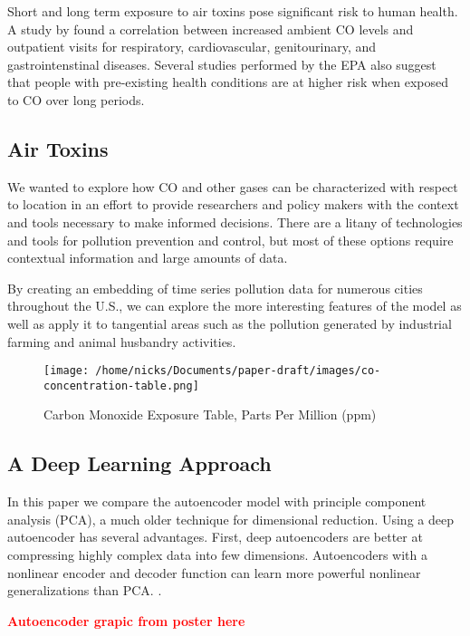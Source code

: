 \documentclass{article}
\newcommand\note[1]{\textbf{\textcolor{red}{#1}}}
\begin{document}
Short and long term exposure to air toxins pose significant risk to human health. 
A study by \textcite{Wang19} found a correlation  between increased ambient CO
levels and outpatient visits for respiratory, cardiovascular, genitourinary, and gastrointenstinal
diseases. Several studies performed by the EPA also suggest that people with pre-existing health
conditions are at higher risk when exposed to CO over long periods.\par

\subsection{Air Toxins}
We wanted to explore how CO and other gases can be characterized with respect to location
in an effort to provide researchers and policy makers with the context and tools necessary to
make informed decisions. There are a litany of technologies and tools for pollution prevention
and control, but most of these options require contextual information and large amounts of data.
\par
By creating an embedding of time series pollution data for numerous cities throughout the U.S.,
we can explore the more interesting features of the model as well as apply it to tangential 
areas such as the pollution generated by industrial farming and animal husbandry activities.

\begin{figure}[h]
\texttt{[image: /home/nicks/Documents/paper-draft/images/co-concentration-table.png]}
    \caption{Carbon Monoxide Exposure Table, Parts Per Million (ppm)}
    \label{fig:co-exposure}
\end{figure}

\subsection{A Deep Learning Approach}
In this paper we compare the autoencoder model with principle component analysis (PCA), a much
older technique for dimensional reduction. Using a deep autoencoder has several advantages.
First, deep autoencoders are better at compressing highly complex data into few dimensions.
Autoencoders with a nonlinear encoder and decoder function can learn more powerful nonlinear
generalizations than PCA. \parencite{Goodfellow16}.
\par \note{Autoencoder grapic from poster here}
\end{document}
